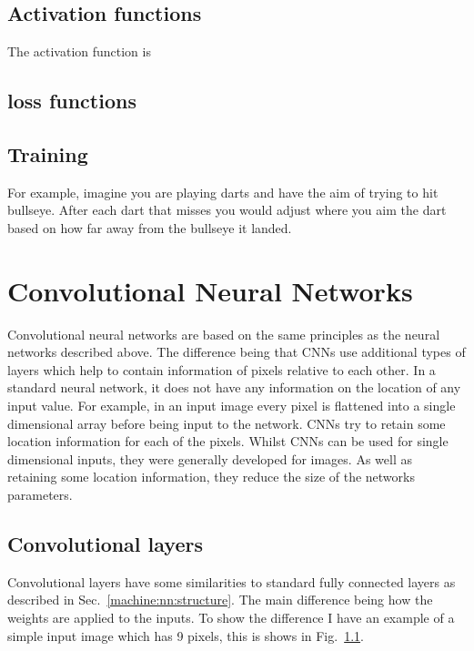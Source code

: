 \subsection{\label{machine:nn:activation}Activation functions}

The activation function is


\subsection{\label{machine:nn:loss}loss functions}


\subsection{\label{machine:nn:training}Training}

For example, imagine you are playing darts and have the aim of trying to hit bullseye.
After each dart that misses you would adjust where you aim the dart based on how far away from the bullseye it landed.

\section{Convolutional Neural Networks}

Convolutional neural networks are based on the same principles as the neural networks described above. 
The difference being that \acp{CNN} use additional types of layers which help to contain information of pixels relative to each other.
In a standard neural network, it does not have any information on the location of any input value.
For example, in an input image every pixel is flattened into a single dimensional array before being input to the network.
\acp{CNN} try to retain some location information for each of the pixels.
Whilst \acp{CNN} can be used for single dimensional inputs, they were generally developed for images.
As well as retaining some location information, they reduce the size of the networks parameters.


\subsection{Convolutional layers}

Convolutional layers have some similarities to standard fully connected layers as described in Sec.~\ref{machine:nn:structure}. 
The main difference being how the weights are applied to the inputs.
To show the difference I have an example of a simple input image which has 9 pixels, this is shows in Fig.~\ref{}.

